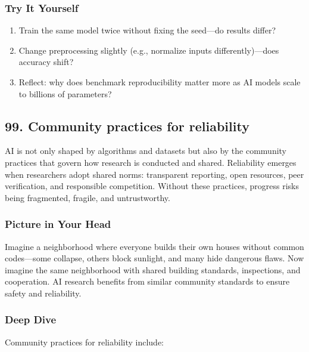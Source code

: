 \documentclass[
  letterpaper,
  DIV=11,
  numbers=noendperiod]{scrreprt}
\providecommand{\tightlist}{%
  \setlength{\itemsep}{0pt}\setlength{\parskip}{0pt}}
\begin{document}
\subsubsection{Try It Yourself}\label{try-it-yourself-97}

\begin{enumerate}
\def\labelenumi{\arabic{enumi}.}
\tightlist
\item
  Train the same model twice without fixing the seed---do results
  differ?
\item
  Change preprocessing slightly (e.g., normalize inputs
  differently)---does accuracy shift?
\item
  Reflect: why does benchmark reproducibility matter more as AI models
  scale to billions of parameters?
\end{enumerate}

\subsection{99. Community practices for
reliability}\label{community-practices-for-reliability}

AI is not only shaped by algorithms and datasets but also by the
community practices that govern how research is conducted and shared.
Reliability emerges when researchers adopt shared norms: transparent
reporting, open resources, peer verification, and responsible
competition. Without these practices, progress risks being fragmented,
fragile, and untrustworthy.

\subsubsection{Picture in Your Head}\label{picture-in-your-head-98}

Imagine a neighborhood where everyone builds their own houses without
common codes---some collapse, others block sunlight, and many hide
dangerous flaws. Now imagine the same neighborhood with shared building
standards, inspections, and cooperation. AI research benefits from
similar community standards to ensure safety and reliability.

\subsubsection{Deep Dive}\label{deep-dive-98}

Community practices for reliability include:
\end{document}
